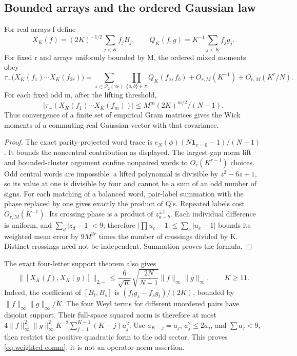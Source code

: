 \subsection{Bounded arrays and the ordered Gaussian law}
For real arrays f define
\[
 X_K(f)=(2K)^{-1/2}\sum_{j<K} f_j B_j,\qquad
 Q_K(f,g)=K^{-1}\sum_{j<K}f_jg_j.
\]
For fixed r and arrays uniformly bounded by M, the ordered mixed moments obey
\begin{equation}\label{eq:weighted-moments}
 \tau_-\bigl(X_K(f_1)\cdots X_K(f_{2r})\bigr)
 =\sum_{\pi\in\mathcal P_2(2r)}\prod_{\{a,b\}\in\pi}Q_K(f_a,f_b)
       +O_{r,M}(K^{-1})+O_{r,M}(K^r/N).
\end{equation}
For each fixed odd m, after the lifting threshold,
\[
 |\tau_-(X_K(f_1)\cdots X_K(f_m))|
       \leq M^m(2K)^{m/2}/(N-1).
\]
Thus convergence of a finite set of empirical Gram matrices gives the Wick
moments of a commuting real Gaussian vector with that covariance.

\begin{proof}
The exact parity-projected word trace is
$e_N(\phi)(N\mathbf1_{v=0}-1)/(N-1)$. It bounds the noncentral contribution
as displayed. The largest-gap norm lift and bounded-cluster argument confine
nonpaired words to $O_r(K^{r-1})$ choices. Odd central words are impossible:
a lifted polynomial is divisible by $z^2-6z+1$, so its value at one is
divisible by four and cannot be a sum of an odd number of signs.
For each matching of a balanced word, pair-label summation with the phase
replaced by one gives exactly the product of Q's. Repeated labels cost
$O_{r,M}(K^{-1})$. Its crossing phase is a product of $z_{a-b}^{\pm1}$.
Each individual difference is uniform, and $\sum_d|z_d-1|<9$; therefore
$|\prod u_e-1|\leq\sum_e|u_e-1|$ bounds its weighted mean error by
$9M^{2r}$ times the number of crossings divided by K. Distinct crossings
need not be independent. Summation proves the formula.
\end{proof}
The exact four-letter support theorem also gives
\begin{equation}\label{eq:weighted-comm}
 \|[X_K(f),X_K(g)]\|_{2,-}
 \leq\frac{6}{\sqrt K}\sqrt{\frac{2N}{N-1}}
                   \|f\|_\infty\|g\|_\infty,\qquad K\geq11.
\end{equation}
Indeed, the coefficient of $[B_t,B_s]$ is
$(f_tg_s-f_sg_t)/(2K)$, bounded by $\|f\|_\infty\|g\|_\infty/K$.
The four Weyl terms for different unordered pairs have disjoint support.
Their full-space squared norm is therefore at most
$4\|f\|_\infty^2\|g\|_\infty^2K^{-2}\sum_{j=1}^{K-1}(K-j)a_j^2$.
Use $a_{K-j}=a_j$, $a_j^2\leq2a_j$, and $\sum a_j<9$, then restrict the
positive quadratic form to the odd sector. This proves
\eqref{eq:weighted-comm}; it is not an operator-norm assertion.


